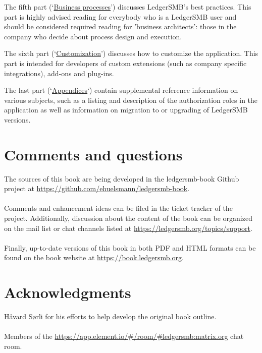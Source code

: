 \documentclass[10pt,a4paper]{book}
\begin{document}
The fifth part (\lq\hyperref[part-business-processes]{Business processes}\rq) discusses LedgerSMB's best practices. 
This part is highly advised
reading for everybody who is a LedgerSMB user and should be considered required reading for 'business
architects': those in the company who decide about process design and execution.

The sixth part (\lq\hyperref[part-customization]{Customization}\rq) discusses how to customize the application. 
This part is intended for developers of
custom extensions (such as company specific integrations), add-ons and plug-ins.

The last part (\lq\hyperref[part-appendices]{Appendices}\lq) contain supplemental reference information on various subjects, 
such as a listing and description
of the authorization roles in the application as well as information on migration to or upgrading of
LedgerSMB versions.


\section*{Comments and questions}
\label{sec-comments}

The sources of this book are being developed in the ledgersmb-book Github project at
\url{https://github.com/ehuelsmann/ledgersmb-book}. \\
~ \\
Comments and enhancement ideas can be filed
in the ticket tracker of the project. Additionally, discussion about the content of the book
can be organized on the mail list or chat channels listed  at \url{https://ledgersmb.org/topics/support}.\\
~ \\
Finally, up-to-date versions of this book in both PDF and HTML formats can be found on the book website at \url{https://book.ledgersmb.org}.


\section*{Acknowledgments}
\label{sec-acknowledgements}

H{\aa}vard S{\o}rli for his efforts to help develop the original book outline.\\
~ \\
Members of the \url{https://app.element.io/#/room/#ledgersmb:matrix.org}  chat room.









\clearpage
{}
\printglossary[type=acronym]

\clearpage
{}
\printglossary


\clearpage
{}
\printindex
\end{document}
